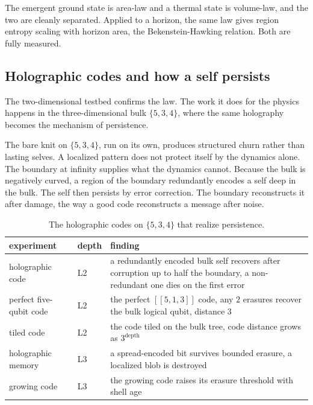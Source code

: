 \begin{result}
The emergent ground state is area-law and a thermal state is volume-law, and the two are cleanly separated. Applied to a horizon, the same law gives region entropy scaling with horizon area, the Bekenstein-Hawking relation. Both are fully measured.
\end{result}

\subsection{Holographic codes and how a self persists}

The two-dimensional testbed confirms the law. The work it does for the physics happens in the three-dimensional bulk $\{5,3,4\}$, where the same holography becomes the mechanism of persistence.

The bare knit on $\{5,3,4\}$, run on its own, produces structured churn rather than lasting selves. A localized pattern does not protect itself by the dynamics alone. The boundary at infinity supplies what the dynamics cannot. Because the bulk is negatively curved, a region of the boundary redundantly encodes a self deep in the bulk. The self then persists by error correction. The boundary reconstructs it after damage, the way a good code reconstructs a message after noise.

\begin{table}[ht]
\centering
\begin{tabular}{@{}lll@{}}
\toprule
experiment & depth & finding \\
\midrule
holographic code & L2 & a redundantly encoded bulk self recovers after corruption up to half the boundary, a non-redundant one dies on the first error \\
perfect five-qubit code & L2 & the perfect $[[5,1,3]]$ code, any $2$ erasures recover the bulk logical qubit, distance $3$ \\
tiled code & L2 & the code tiled on the bulk tree, code distance grows as $3^{\text{depth}}$ \\
holographic memory & L3 & a spread-encoded bit survives bounded erasure, a localized blob is destroyed \\
growing code & L3 & the growing code raises its erasure threshold with shell age \\
\bottomrule
\end{tabular}
\caption{The holographic codes on $\{5,3,4\}$ that realize persistence.}
\label{tab:hol-codes}
\end{table}


